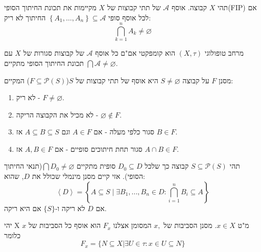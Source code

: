 \documentclass{tstextbook}
\begin{document}
\begin{definition}
תהי \(X\) קבוצה. אוסף \(\mathcal{A}\) של תתי קבוצות של \(X\) מקיימות את תכונת החיתוך הסופי(FIP) אם לכל אוסף סופי \(\left\{  A_{1},\dots,A_{n}  \right\}\subseteq \mathcal{A}\) החיתוך לא ריק:
$$\bigcap_{k=1}^{n}A_{k}\neq \varnothing $$

\end{definition}
\begin{proposition}
מרחב טופולוגי \(\left( X,\tau \right)\) הוא קומפקטי אם"ם כל אוסף \(\mathcal{A}\) של קבוצות סגורות של \(X\) עם תכונת החיתוך הסופי מתקיים \(\bigcap \mathcal{A}\neq \varnothing\).

\end{proposition}
\begin{definition}[מסנן]
מסנן \(F\) על קבוצה \(S\neq \varnothing\) היא אוסף של תתי קבוצות של \(S\)(\(F\subseteq \mathcal{P}(S)\)) המקיים:

  \begin{enumerate}
    \item לא ריק - \(F \neq \varnothing\). 


    \item לא מכיל את הקבוצה הריקה - \(\varnothing \not\in F\). 


    \item סגור כלפי מעלה - אם \(A \in F\) וגם \(A\subseteq B \subseteq S\) אז \(B\in F\). 


    \item סגור תחת חיתוכים סופיים - אם \(A,B \in F\) אז \(A\cap B \in F\). 


  \end{enumerate}
\end{definition}
\begin{proposition}
תהי \(S\subseteq \mathcal{P}(S)\) קבוצה כך שלכל \(D_{0} \subseteq D\) סופית מתקיים \(\bigcap D_{0} \neq \varnothing\)(תנאי החיתוך הסופי). אזי קיים מסנן מינמלי שכולל את \(D\), שהוא:
$$\left\langle D\right\rangle=\left\{A\subseteq S\mid\exists B_{1},...,B_{n}\in D:\bigcap_{i=1}^{n}B_{i}\subseteq A\right\}$$
אם \(D\) לא ריקה ו-\(\{ S \}\) אם היא ריקה.

\end{proposition}
\begin{definition}
יהי X מ"ט \(x\in X\). מסנן הסביבות של \(x,\) המסומן אצלנו \(F_{x}\) הוא אוסף כל הסביבות של \(x\) כלומר
$$F_{x}=\{N\subseteq X|\exists U\in\tau:x\in U\subseteq N\}$$

\end{definition}
\end{document}
